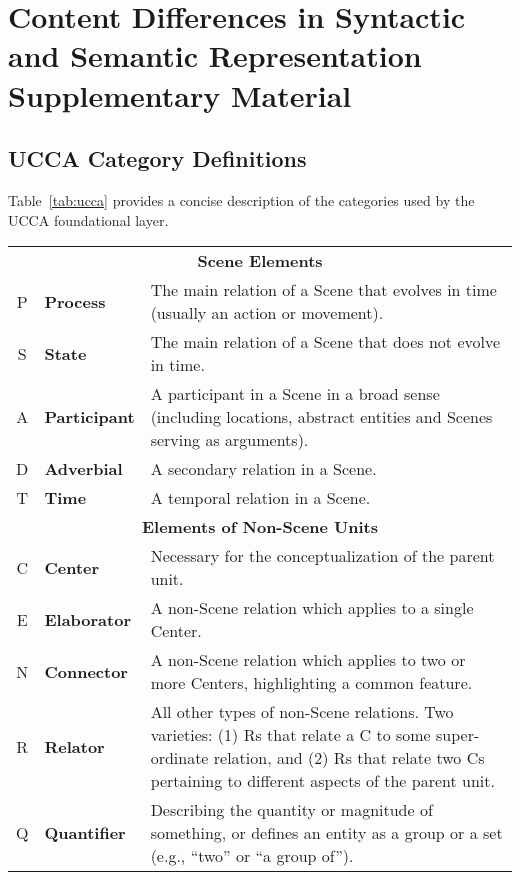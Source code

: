 %

\chapter{Content Differences in Syntactic and Semantic Representation \\ Supplementary Material}

\section{UCCA Category Definitions}\label{sec:definitions}

Table~\ref{tab:ucca} provides a concise description of the
categories used by the UCCA foundational layer.

\begin{table}[H]
\centering
\footnotesize
\begin{tabular}{cp{2cm}p{12.5cm}}
\multicolumn{3}{c}{\bf Scene Elements}\\
P & {\bf Process} & The main relation of a Scene that evolves in time (usually an action or movement).\\
S & {\bf State} & The main relation of a Scene that does not evolve in time.\\
A & {\bf Participant} & A participant in a Scene in a broad sense (including locations, abstract entities and Scenes serving as arguments).\\
D & {\bf Adverbial} & A secondary relation in a Scene.\\
T & {\bf Time} & A temporal relation in a Scene.\\
\multicolumn{3}{c}{{\bf Elements of Non-Scene Units}}\\
C & {\bf Center} & Necessary for the conceptualization of the parent unit.\\
E & {\bf Elaborator} & A non-Scene relation which applies to a single Center.\\
N & {\bf Connector} & A non-Scene relation which applies to two or more Centers, highlighting a common feature.\\
R & {\bf Relator} & All other types of non-Scene relations. Two varieties: (1) Rs that relate a C to some super-ordinate relation, and
(2) Rs that relate two Cs pertaining to different aspects of the parent unit. \\
Q & {\bf Quantifier} & Describing the quantity or magnitude of something, or defines an entity as a group or a set (e.g., ``two'' or ``a group of'').\\

\end{tabular}
\end{table}
